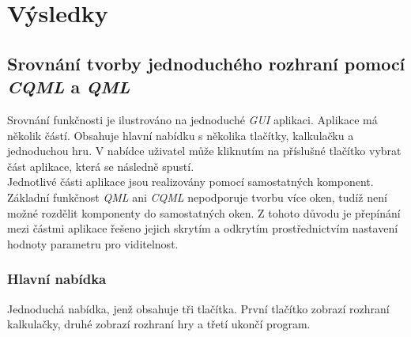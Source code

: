 \documentclass[11pt,twoside,a4paper]{book}
\begin{document}
\chapter{\label{CH:conc}Výsledky}
\section{\label{SEC:Conclusion}Srovnání tvorby jednoduchého rozhraní pomocí \textit{CQML} a \textit{QML}}
Srovnání funkčnosti je ilustrováno na jednoduché \textit{GUI} aplikaci. Aplikace má několik částí. Obsahuje hlavní nabídku s několika tlačítky, kalkulačku a jednoduchou hru. V nabídce uživatel může kliknutím na příslušné tlačítko vybrat část aplikace, která se následně spustí.\\
Jednotlivé části aplikace jsou realizovány pomocí samostatných komponent. Základní funkčnost \textit{QML} ani \textit{CQML} nepodporuje tvorbu více oken, tudíž není možné rozdělit komponenty do samostatných oken. Z tohoto důvodu je přepínání mezi částmi aplikace řešeno jejich skrytím a odkrytím prostřednictvím nastavení hodnoty parametru pro viditelnost.
\subsection{Hlavní nabídka}
Jednoduchá nabídka, jenž obsahuje tři tlačítka. První tlačítko zobrazí rozhraní kalkulačky, druhé zobrazí rozhraní hry a třetí ukončí program.
\end{document}
